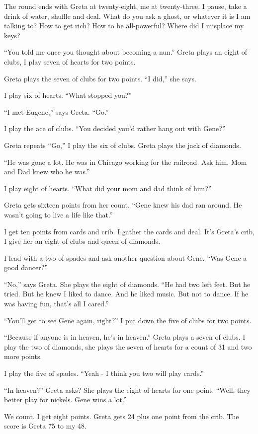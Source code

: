 \documentclass[
  letterpaper,
  DIV=11,
  numbers=noendperiod]{scrreprt}
\begin{document}
The round ends with Greta at twenty-eight, me at twenty-three. I pause,
take a drink of water, shuffle and deal. What do you ask a ghost, or
whatever it is I am talking to? How to get rich? How to be all-powerful?
Where did I misplace my keys?

``You told me once you thought about becoming a nun.'' Greta plays an
eight of clubs, I play seven of hearts for two points.

Greta plays the seven of clubs for two points. ``I did,'' she says.

I play six of hearts. ``What stopped you?''

``I met Eugene,'' says Greta. ``Go.''

I play the ace of clubs. ``You decided you'd rather hang out with
Gene?''

Greta repeats ``Go,'' I play the six of clubs. Greta plays the jack of
diamonds.

``He was gone a lot. He was in Chicago working for the railroad. Ask
him. Mom and Dad knew who he was.''

I play eight of hearts. ``What did your mom and dad think of him?''

Greta gets sixteen points from her count. ``Gene knew his dad ran
around. He wasn't going to live a life like that.''

I get ten points from cards and crib. I gather the cards and deal. It's
Greta's crib, I give her an eight of clubs and queen of diamonds.

I lead with a two of spades and ask another question about Gene. ``Was
Gene a good dancer?''

``No,'' says Greta. She plays the eight of diamonds. ``He had two left
feet. But he tried. But he knew I liked to dance. And he liked music.
But not to dance. If he was having fun, that's all I cared.''

``You'll get to see Gene again, right?'' I put down the five of clubs
for two points.

``Because if anyone is in heaven, he's in heaven.'' Greta plays a seven
of clubs. I play the two of diamonds, she plays the seven of hearts for
a count of 31 and two more points.

I play the five of spades. ``Yeah - I think you two will play cards.''

``In heaven?'' Greta asks? She plays the eight of hearts for one point.
``Well, they better play for nickels. Gene wins a lot.''

We count. I get eight points. Greta gets 24 plus one point from the
crib. The score is Greta 75 to my 48.
\end{document}
